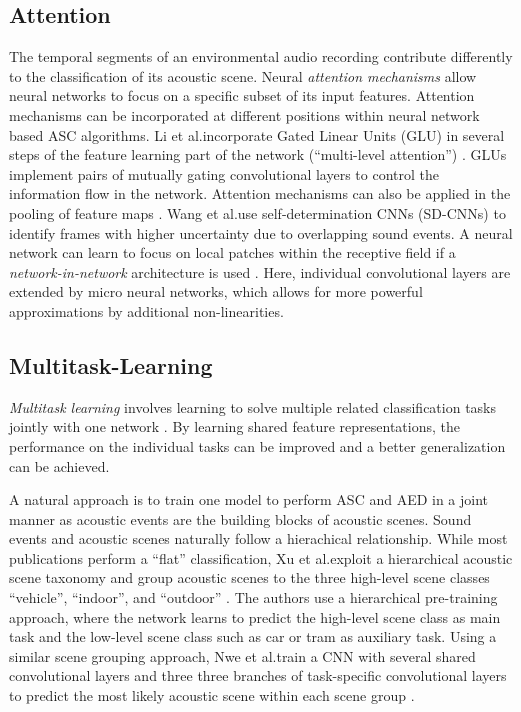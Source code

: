 \documentclass[applsci,article,submit,oneauthor,pdftex]{Definitions/mdpi}
\makeatletter
\newcommand{\etal}{{et al}.\@ }
\makeatother
\begin{document}
\subsection{Attention}
\label{sec:attention}
The temporal segments of an environmental audio recording contribute differently to the classification of its acoustic scene.
Neural \textit{attention mechanisms} allow neural networks to focus on a specific subset of its input features.
Attention mechanisms can be incorporated at different positions within neural network based ASC algorithms.
Li \etal incorporate Gated Linear Units (GLU) in several steps of the feature learning part of the network (``multi-level attention'') \citep{Li:2019:MultilevelAttention:ICMEW}.
GLUs implement pairs of mutually gating convolutional layers to  control the information flow in the network.
Attention mechanisms can also be applied in the pooling of feature maps \citep{Ren:2018:AttentionASC:DCASE}.
Wang \etal use self-determination CNNs (SD-CNNs) to identify frames with higher uncertainty due to overlapping sound events. 
A neural network can learn to focus on local patches within the receptive field if a \textit{network-in-network} architecture is used 
\citep{Wang:2018:SelfDeterminationASC:APSIPA}.
Here, individual convolutional layers are extended by micro neural networks, which allows for more powerful approximations by additional non-linearities.

\subsection{Multitask-Learning}
\label{sec:multitask_learning}

\textit{Multitask learning} involves learning to solve multiple related classification tasks jointly with one network \citep{Ruder:2017:MultitaskLearning:ARXIV}.
By learning shared feature representations, the performance on the individual tasks can be improved and a better generalization can be achieved.

A natural approach is to train one model to perform ASC and AED in a joint manner \citep{Bear:2019:JointASCAED:INTERSPEECH} as acoustic events are the building blocks of acoustic scenes.
Sound events and acoustic scenes naturally follow a hierachical relationship.
While most publications perform a ``flat'' classification, Xu \etal exploit a hierarchical acoustic scene taxonomy and group acoustic scenes to the three high-level scene classes ``vehicle'', ``indoor'', and ``outdoor'' \citep{Xu:2016:HierarchicalASC:DCASE}. The authors use a hierarchical pre-training approach, where the network learns to predict the high-level scene class as main task and the low-level scene class such as car or tram as auxiliary task.
Using a similar scene grouping approach, Nwe \etal train a CNN with several shared convolutional layers and three three branches of task-specific convolutional layers to predict the most likely acoustic scene within each scene group \citep{Nwe:2017:MultiTaskASC:APSIPA}.
\end{document}
